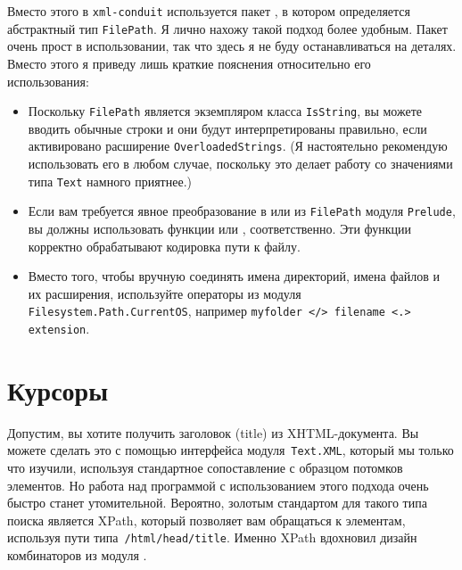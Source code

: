 Вместо этого в \lstinline!xml-conduit! используется пакет
,
в котором определяется абстрактный тип \lstinline!FilePath!. Я лично нахожу
такой подход более удобным. Пакет очень прост в использовании, так что здесь я
не буду останавливаться на деталях. Вместо этого я приведу лишь краткие
пояснения относительно его использования:
\begin{itemize}
    \item Поскольку \lstinline!FilePath! является экземпляром класса
        \lstinline!IsString!, вы можете вводить обычные строки и они будут
        интерпретированы правильно, если активировано расширение
        \lstinline!OverloadedStrings!. (Я настоятельно рекомендую использовать
        его в любом случае, поскольку это делает работу со значениями типа
        \lstinline!Text! намного приятнее.)

    \item Если вам требуется явное преобразование в или из \lstinline!FilePath!
        модуля \lstinline!Prelude!, вы должны использовать функции
        или
        ,
        соответственно. Эти функции корректно обрабатывают кодировка пути к
        файлу.

    \item Вместо того, чтобы вручную соединять имена директорий, имена файлов и
        их расширения, используйте операторы из модуля
        \lstinline!Filesystem.Path.CurrentOS!, например
        \lstinline!myfolder </> filename <.> extension!.
\end{itemize}
  
\section{Курсоры}
Допустим, вы хотите получить заголовок (title) из XHTML-документа. Вы можете
сделать это с помощью интерфейса модуля~\lstinline!Text.XML!, который мы только
что изучили, используя стандартное сопоставление с образцом потомков элементов.
Но работа над программой с использованием этого подхода очень быстро станет
утомительной. Вероятно, золотым стандартом для такого типа поиска является
XPath, который позволяет вам обращаться к элементам, используя пути
типа~\lstinline!/html/head/title!. Именно XPath вдохновил дизайн комбинаторов
из модуля
.

